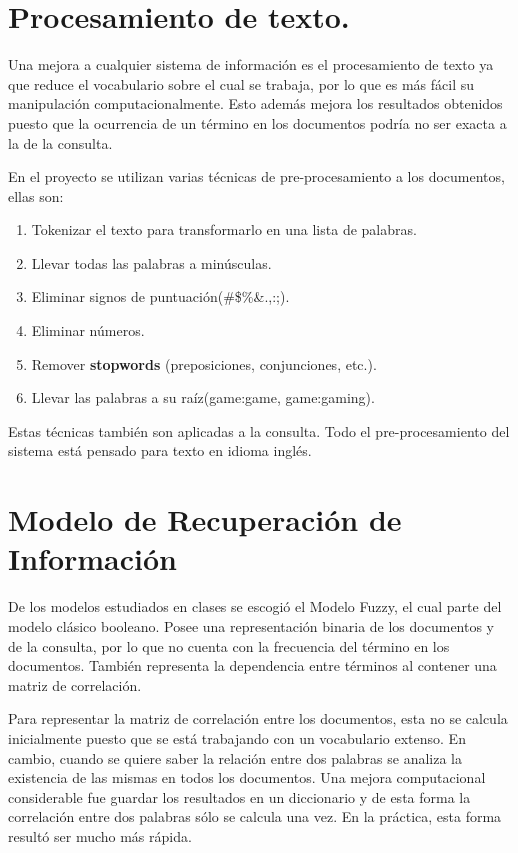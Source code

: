 \documentclass[]{article}
\begin{document}
\section{Procesamiento de texto.}
\label{section:procText}
Una mejora a cualquier sistema de información es el procesamiento de texto ya que reduce el vocabulario sobre el cual se trabaja, por lo que es más fácil su manipulación computacionalmente. Esto además mejora los resultados obtenidos puesto que la ocurrencia de un término en los documentos podría no ser exacta a la de la consulta. 

En el proyecto se utilizan varias técnicas de pre-procesamiento a los documentos, ellas son:

\begin{enumerate}
	\item Tokenizar el texto para transformarlo en una lista de palabras.
	\item Llevar todas las palabras a minúsculas.
	\item Eliminar signos de puntuación(\@\#\$\%\&.,:;).
	\item Eliminar números.
	\item Remover \textbf{stopwords} (preposiciones, conjunciones, etc.).
	\item Llevar las palabras a su raíz(game:game, game:gaming).
\end{enumerate}

Estas técnicas también son aplicadas a la consulta. Todo el pre-procesamiento del sistema está pensado para texto en idioma inglés. 

\section{Modelo de Recuperación de Información}
\label{section:model}
De los modelos estudiados en clases se escogió el Modelo Fuzzy, el cual parte del modelo clásico booleano. Posee una representación binaria de los documentos y de la consulta, por lo que no cuenta con la frecuencia del término en los documentos. También representa la dependencia entre términos al contener una matriz de correlación.

Para representar la matriz de correlación entre los documentos, esta no se calcula inicialmente puesto que se está trabajando con un vocabulario extenso. En cambio, cuando se quiere saber la relación entre dos palabras se analiza la existencia de las mismas en todos los documentos. Una mejora computacional considerable fue guardar los resultados en un diccionario y de esta forma la correlación entre dos palabras sólo se calcula una vez. En la práctica, esta forma resultó ser mucho más rápida.
\end{document}
